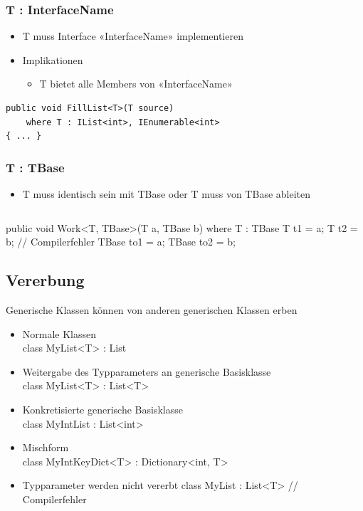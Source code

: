 \subsubsection{T : InterfaceName}
\begin{itemize}
    \item T muss Interface «InterfaceName» implementieren
    \item Implikationen
    \begin{itemize}
        \item T bietet alle Members von «InterfaceName»
    \end{itemize}
\end{itemize}
\begin{lstlisting}
public void FillList<T>(T source)
    where T : IList<int>, IEnumerable<int>
{ ... }
\end{lstlisting}

\subsubsection{T : TBase}
\begin{itemize}
    \item T muss identisch sein mit TBase oder T muss von TBase ableiten
\end{itemize}
\begin{lstlisting}

\end{lstlisting}
public void Work<T, TBase>(T a, TBase b)
where T : TBase {
    T t1 = a;
    T t2 = b; // Compilerfehler
    TBase to1 = a;
    TBase to2 = b;
}


\subsection{Vererbung}

Generische Klassen können von anderen generischen Klassen erben

\begin{itemize}
    \item Normale Klassen\\
    class MyList<T> : List { }
    \item Weitergabe des Typparameters an generische Basisklasse\\
    class MyList<T> : List<T> { }
    \item Konkretisierte generische Basisklasse\\
    class MyIntList : List<int> {}
    \item Mischform \\
    class MyIntKeyDict<T> : Dictionary<int, T> { }
    \item Typparameter werden nicht vererbt
    class MyList : List<T> { } // Compilerfehler
\end{itemize}


